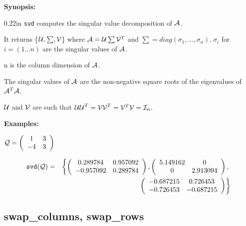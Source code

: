 {\bf Synopsis:} %

\begin{addtolength}{\leftskip}{0.22in}
{\tt svd} computes the singular value decomposition of ${\cal A}$. 

It returns \{${\cal U},\sum,{\cal V}$\} where ${\cal A} = {\cal U} 
\sum {\cal V}^T$ and $\sum = diag(\sigma_{1}, \ldots ,\sigma_{n}). \; 
\sigma_{i}$ for $i= (1 \ldots n)$ are the singular values of ${\cal A}$.
 

n is the column dimension of ${\cal A}$.

The singular values of ${\cal A}$ are the non-negative square roots of 
the eigenvalues of ${\cal A}^T {\cal A}$. 

${\cal U}$ and ${\cal V}$ are such that ${\cal UU}^T = {\cal VV}^T = 
{\cal V}^T {\cal V} = {\cal I}_n$.

\end{addtolength}

{\bf Examples:}

\begin{flushleft}
\hspace*{0.175in}
\begin{math}  
{\cal Q} = \left( \begin{array}{cc} 1 & 3 \\ -4 & 3 
\end{array} \right)
\end{math}  
\end{flushleft}

\begin{eqnarray}
\hspace*{0.1in}
{\tt svd({\cal Q})} & = & 
\left\{ 
        \left( \begin{array}{cc} 0.289784 & 0.957092 \\ -0.957092 & 
0.289784 \end{array} \right), \left( \begin{array}{cc} 5.149162 & 0 \\ 
0 & 2.913094 \end{array} \right), \right. \nonumber \\ & & \left. \: \; 
\, \left( \begin{array}{cc} -0.687215 & 0.726453 \\ -0.726453 & 
-0.687215 \end{array} \right)       
\right\} \nonumber
\end{eqnarray}


\subsection{swap\_columns, swap\_rows}

